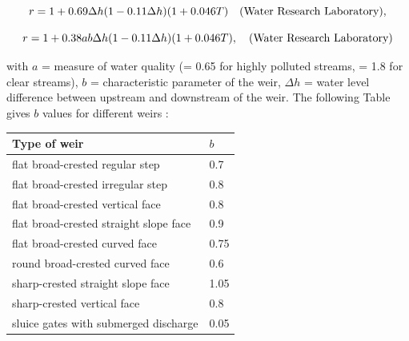 \begin{equation}
  r = 1 + 0.69 \Delta h (1 - 0.11 \Delta h) (1 +0.046 T) \quad \rm{(Water~Research~Laboratory)},
\end{equation}

\begin{equation}
  r = 1 + 0.38 a b  \Delta h (1 - 0.11 \Delta h) (1 +0.046 T),
  \quad \rm{(Water~Research~Laboratory)}
\end{equation}

with $a$ = measure of water quality (= 0.65 for highly polluted streams,
= 1.8 for clear streams),
$b$ = characteristic parameter of the weir,
$\Delta h$ = water level difference between upstream and downstream of the weir.
The following Table gives $b$ values for different weirs \cite{mccutcheon_wq_1989}:\\

\begin{table}[H]
 			\centering
\begin{tabular}{p{3.0in}p{3.0in}}
\hline
\multicolumn{1}{|p{3.0in}}{Type of weir} & 
\multicolumn{1}{|p{3.0in}|}{$b$} \\
\hline
\multicolumn{1}{|p{3.0in}}{flat broad-crested regular step} & 
\multicolumn{1}{|p{3.0in}|}{0.7} \\
\hline
\multicolumn{1}{|p{3.0in}}{flat broad-crested irregular step} & 
\multicolumn{1}{|p{3.0in}|}{0.8} \\
\hline
\multicolumn{1}{|p{3.0in}}{flat broad-crested vertical face} & 
\multicolumn{1}{|p{3.0in}|}{0.8} \\
\hline
\multicolumn{1}{|p{3.0in}}{flat broad-crested straight slope face} & 
\multicolumn{1}{|p{3.0in}|}{0.9} \\
\hline
\multicolumn{1}{|p{3.0in}}{flat broad-crested curved face} & 
\multicolumn{1}{|p{3.0in}|}{0.75} \\
\hline
\multicolumn{1}{|p{3.0in}}{round broad-crested curved face} & 
\multicolumn{1}{|p{3.0in}|}{0.6} \\
\hline
\multicolumn{1}{|p{3.0in}}{sharp-crested straight slope face} & 
\multicolumn{1}{|p{3.0in}|}{1.05} \\
\hline
\multicolumn{1}{|p{3.0in}}{sharp-crested vertical face} & 
\multicolumn{1}{|p{3.0in}|}{0.8} \\
\hline
\multicolumn{1}{|p{3.0in}}{sluice gates with submerged discharge} & 
\multicolumn{1}{|p{3.0in}|}{0.05} \\
\hline

\end{tabular}
\end{table}

